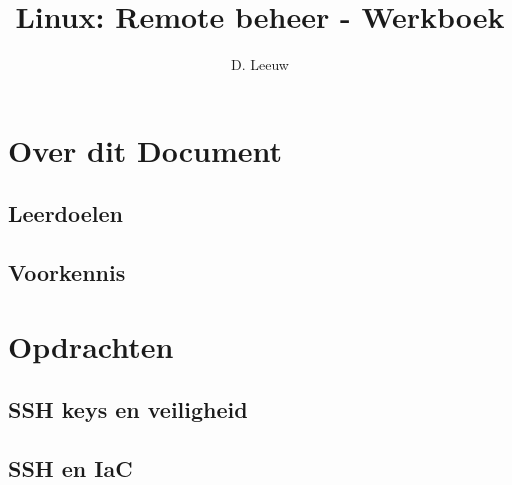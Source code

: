 \documentclass[a4paper,12pt,twoside,openright,titlepage]{article}
\author{D. Leeuw}
\title{Linux: Remote beheer - Werkboek}
\date{\today\\
\vfill
\raggedright
\copyright\ 2026 Dennis Leeuw\\
}
\begin{document}

\maketitle


\section{Over dit Document}
\subsection{Leerdoelen}
%
\subsection{Voorkennis}
%



\section{Opdrachten}
\subsection{SSH keys en veiligheid}

\subsection{SSH en IaC}


\end{document}
